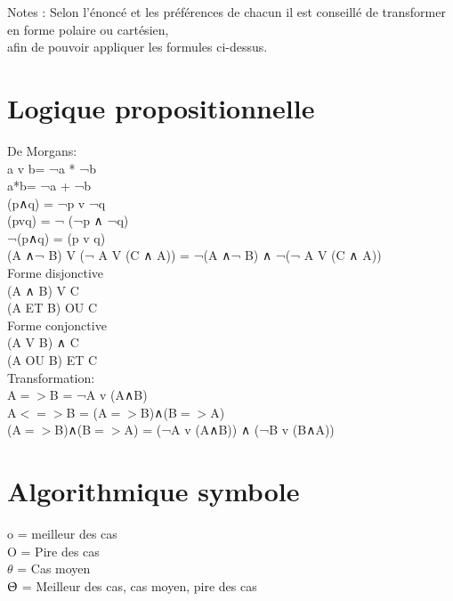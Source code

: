 \vspace{8mm} %

Notes : Selon l'énoncé et les préférences de chacun il est conseillé de transformer en forme polaire ou cartésien,\\
afin de pouvoir appliquer les formules ci-dessus.\\


\newpage
\section{Logique propositionnelle}

\vspace{5mm} %
De Morgans: \\
a v b= ¬a * ¬b \\
a*b= ¬a + ¬b \\
(p∧q) = ¬p v ¬q  \\
(pvq) = ¬ (¬p ∧ ¬q)  \\
¬(p∧q) = (p v q)  \\
(A ∧¬ B) V (¬ A V (C ∧ A)) =  ¬(A ∧¬ B) ∧ ¬(¬ A V (C ∧ A)) \\

\vspace{5mm} %
Forme disjonctive \\
(A ∧ B) V C \\
(A ET B) OU C \\

\vspace{5mm} %
Forme conjonctive \\
(A V B) ∧ C\\
(A OU B) ET C \\

\vspace{5mm} %
Transformation: \\
A$=>$B = ¬A v (A∧B) \\
A$<=>$B = (A$=>$B)∧(B$=>$A)  \\
(A$=>$B)∧(B$=>$A) = (¬A v (A∧B)) ∧ (¬B v (B∧A))


\section{Algorithmique symbole}

\vspace{5mm} %

o = meilleur des cas \\

O = Pire des cas \\

$\theta$ = Cas moyen \\

$\Uptheta$ = Meilleur des cas, cas moyen, pire des cas \\
